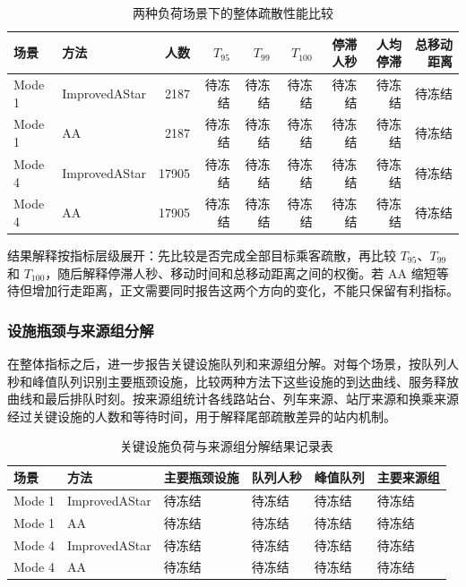 \documentclass[UTF8,a4paper,12pt]{ctexart}
\begin{document}
\begin{table}[htbp]
\centering
\caption{两种负荷场景下的整体疏散性能比较}
\small
\begin{tabular}{llrrrrrrr}
\toprule
场景 & 方法 & 人数 & \(T_{95}\) & \(T_{99}\) & \(T_{100}\) & 停滞人秒 & 人均停滞 & 总移动距离 \\
\midrule
Mode 1 & ImprovedAStar & 2187 & 待冻结 & 待冻结 & 待冻结 & 待冻结 & 待冻结 & 待冻结 \\
Mode 1 & AA & 2187 & 待冻结 & 待冻结 & 待冻结 & 待冻结 & 待冻结 & 待冻结 \\
Mode 4 & ImprovedAStar & 17905 & 待冻结 & 待冻结 & 待冻结 & 待冻结 & 待冻结 & 待冻结 \\
Mode 4 & AA & 17905 & 待冻结 & 待冻结 & 待冻结 & 待冻结 & 待冻结 & 待冻结 \\
\bottomrule
\end{tabular}
\end{table}

结果解释按指标层级展开：先比较是否完成全部目标乘客疏散，再比较 \(T_{95}\)、\(T_{99}\) 和 \(T_{100}\)，随后解释停滞人秒、移动时间和总移动距离之间的权衡。若 AA 缩短等待但增加行走距离，正文需要同时报告这两个方向的变化，不能只保留有利指标。

\subsubsection{设施瓶颈与来源组分解}

在整体指标之后，进一步报告关键设施队列和来源组分解。对每个场景，按队列人秒和峰值队列识别主要瓶颈设施，比较两种方法下这些设施的到达曲线、服务释放曲线和最后排队时刻。按来源组统计各线路站台、列车来源、站厅来源和换乘来源经过关键设施的人数和等待时间，用于解释尾部疏散差异的站内机制。

\begin{table}[htbp]
\centering
\caption{关键设施负荷与来源组分解结果记录表}
\small
\begin{tabular}{p{}p{}p{}p{}p{}p{}}
\toprule
场景 & 方法 & 主要瓶颈设施 & 队列人秒 & 峰值队列 & 主要来源组 \\
\midrule
Mode 1 & ImprovedAStar & 待冻结 & 待冻结 & 待冻结 & 待冻结 \\
Mode 1 & AA & 待冻结 & 待冻结 & 待冻结 & 待冻结 \\
Mode 4 & ImprovedAStar & 待冻结 & 待冻结 & 待冻结 & 待冻结 \\
Mode 4 & AA & 待冻结 & 待冻结 & 待冻结 & 待冻结 \\
\bottomrule
\end{tabular}
\end{table}
\end{document}
